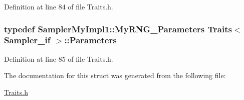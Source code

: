 Definition at line 84 of file Traits.\-h.

\hypertarget{struct_traits_3_01_sampler__if_01_4_a4ad2f3625d3d6fc6cfb35de363d5594e}{
\subsubsection[{Parameters}]{\setlength{\rightskip}{0pt plus 5cm}typedef {\bf Sampler\-My\-Impl1\-::\-My\-R\-N\-G\-\_\-\-Parameters} {\bf Traits}$<$ {\bf Sampler\-\_\-if} $>$\-::{\bf Parameters}}}\label{struct_traits_3_01_sampler__if_01_4_a4ad2f3625d3d6fc6cfb35de363d5594e}


Definition at line 85 of file Traits.\-h.



The documentation for this struct was generated from the following file\-:\begin{DoxyCompactItemize}
\item 
\hyperlink{_traits_8h}{Traits.\-h}\end{DoxyCompactItemize}
